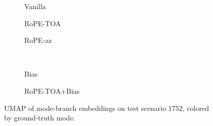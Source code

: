 \begin{figure}[p]
  \centering
  \begin{subfigure}[t]{0.32\linewidth}
    \centering
    \caption{Vanilla}
    \label{fig:exp:emb_w100_md:vanilla}
  \end{subfigure}\hfill
  \begin{subfigure}[t]{0.32\linewidth}
    \centering
    \caption{RoPE-TOA}
    \label{fig:exp:emb_w100_md:rope_toa}
  \end{subfigure}\hfill
  \begin{subfigure}[t]{0.32\linewidth}
    \centering
    \caption{RoPE-az}
    \label{fig:exp:emb_w100_md:rope_az}
  \end{subfigure}\\[0.4em]
  \begin{subfigure}[t]{0.32\linewidth}
    \centering
    \caption{Bias}
    \label{fig:exp:emb_w100_md:bias}
  \end{subfigure}\hspace{0.02\linewidth}
  \begin{subfigure}[t]{0.32\linewidth}
    \centering
    \caption{RoPE-TOA+Bias}
    \label{fig:exp:emb_w100_md:combined}
  \end{subfigure}
  \caption{UMAP of mode-branch embeddings on test scenario $1752$, colored by ground-truth mode.}
  \label{fig:exp:emb_w100_md}
\end{figure}
